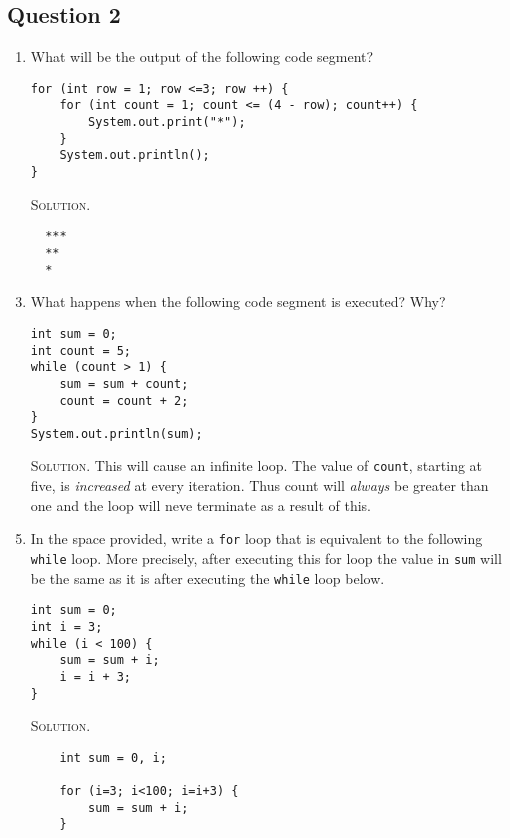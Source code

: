 \documentclass[12pt]{report}
\begin{document}
\subsection*{Question 2}
\begin{enumerate}
\item What will be the output of the following code segment?
\begin{verbatim}
for (int row = 1; row <=3; row ++) {
    for (int count = 1; count <= (4 - row); count++) {
        System.out.print("*");
    }
    System.out.println();
}
\end{verbatim}
\item[\textsc{Solution.}]
\begin{verbatim}
  ***
  **
  *
\end{verbatim}
\vspace{2.5cm}
\item What happens when the following code segment is executed? Why?
\begin{verbatim}
int sum = 0;
int count = 5;
while (count > 1) {
    sum = sum + count;
    count = count + 2;
}
System.out.println(sum);
\end{verbatim}
\vspace{.5cm}
\item[\textsc{Solution.}] This will cause an infinite loop. The value of \texttt{count}, starting at five, is \emph{increased} at every iteration. Thus count will \emph{always} be greater than one and the loop will neve terminate as a result of this.

\clearpage

\item In the space provided, write a \texttt{for} loop that is equivalent to the following \texttt{while} loop. More precisely, 
after executing this for loop the value
in {\tt sum} will be the same as it is after executing the {\tt while} loop
below.


\begin{verbatim}
int sum = 0;
int i = 3;
while (i < 100) {
    sum = sum + i;
    i = i + 3;
}
\end{verbatim}

\item[\textsc{Solution.}] 
\begin{verbatim}
    int sum = 0, i;

    for (i=3; i<100; i=i+3) {
        sum = sum + i;
    }
\end{verbatim}



\end{enumerate}
\end{document}

